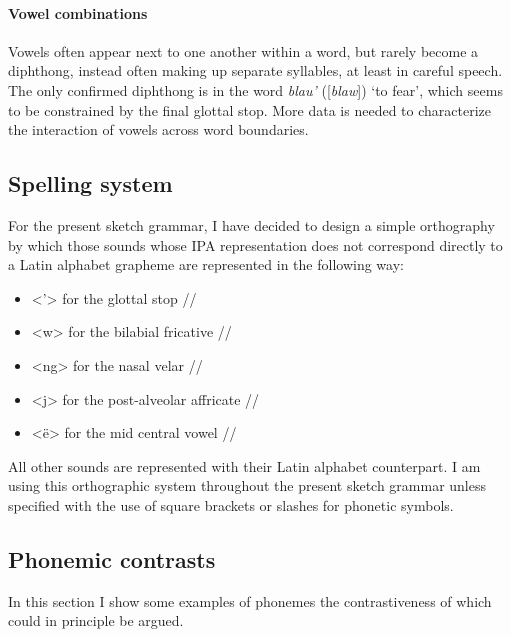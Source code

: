\documentclass{article}
\begin{document}

\paragraph{Vowel combinations}

Vowels often appear next to one another within a word, but rarely become a diphthong, instead often making up separate syllables, at least in careful speech. The only confirmed diphthong is in the word \textit{blau'} ([\textit{blaw\textglotstop}]) `to fear', which seems to be constrained by the final glottal stop. More data is needed to characterize the interaction of vowels across word boundaries.


\subsection{Spelling system}\label{sec:spel}

For the present sketch grammar, I have decided to design a simple orthography by which those sounds whose IPA representation does not correspond directly to a Latin alphabet grapheme are represented in the following way:

\begin{itemize}

\item <'> for the glottal stop /\textglotstop /
\item <w> for the bilabial fricative /\textbeta /
\item <ng> for the nasal velar //
\item <j> for the post-alveolar affricate //
\item <ë> for the mid central vowel /\textschwa /

\end{itemize}

All other sounds are represented with their Latin alphabet counterpart. I am using this orthographic system throughout the present sketch grammar unless specified with the use of square brackets or slashes for phonetic symbols.

\subsection{Phonemic contrasts}\label{sec:contr}

In this section I show some examples of phonemes the contrastiveness of which could in principle be argued.
\end{document}
